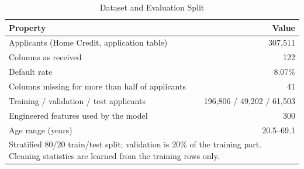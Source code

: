 \begin{table}[t]
\caption{Dataset and Evaluation Split}
\label{tab:dataset}
\centering
\setlength{\tabcolsep}{4pt}
\begin{tabular}{lr}
\hline
\textbf{Property} & \textbf{Value} \\
\hline
Applicants (Home Credit, application table) & 307,511 \\
Columns as received & 122 \\
Default rate & 8.07\% \\
Columns missing for more than half of applicants & 41 \\
Training / validation / test applicants & 196,806 / 49,202 / 61,503 \\
Engineered features used by the model & 300 \\
Age range (years) & 20.5--69.1 \\
\hline
\multicolumn{2}{p{0.92\linewidth}}{\footnotesize Stratified 80/20 train/test split; validation is 20\% of the training part. Cleaning statistics are learned from the training rows only.} \\
\end{tabular}
\end{table}
